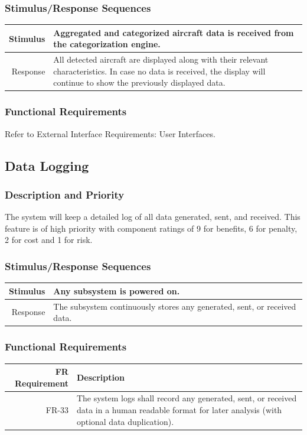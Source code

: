 \documentclass[12pt,oneside,letterpaper]{article}
\begin{document}
\subsubsection{Stimulus/Response Sequences}
\begin{longtable}{|r|p{3.8in}|}
\hline
Stimulus& Aggregated and categorized aircraft data is received from the categorization engine. \\
\hline
Response & All detected aircraft are displayed along with their relevant characteristics. In case no data is received, the display will continue to show the previously displayed data. \\
\hline
\end{longtable}
\subsubsection{Functional Requirements}
Refer to External Interface Requirements: User Interfaces.

\subsection{Data Logging}
\subsubsection{Description and Priority}
The system will keep a detailed log of all data generated, sent, and received. This feature is of high priority with component ratings of 9 for benefits, 6 for penalty, 2 for cost and 1 for risk.
\subsubsection{Stimulus/Response Sequences}
\begin{longtable}{|r|p{3.8in}|}
\hline
Stimulus & Any subsystem is powered on. \\
\hline
Response & The subsystem continuously stores any generated, sent, or received data. \\
\hline
\end{longtable}
\subsubsection{Functional Requirements}
\begin{longtable}{|r|p{3.8in}|}
\hline
FR Requirement & Description \\
\hline
FR-33 & The system logs shall record any generated, sent, or received data in a human readable format for later analysis (with optional data duplication). \\
\hline
\end{longtable}
\end{document}
